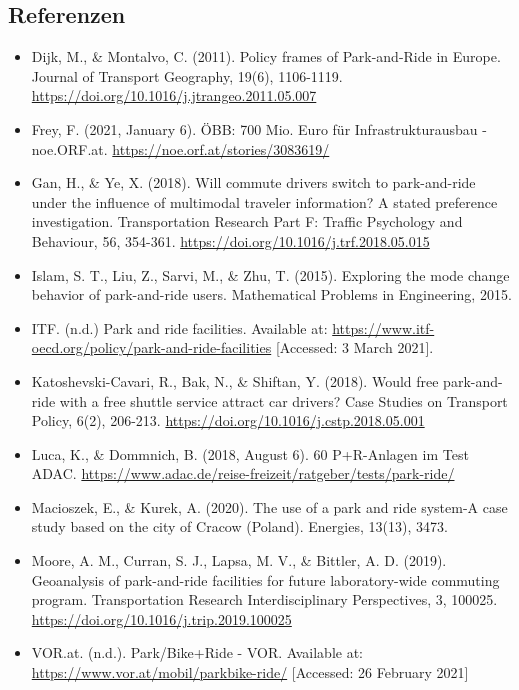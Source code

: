 \documentclass[
]{book}
\providecommand{\tightlist}{%
  \setlength{\itemsep}{0pt}\setlength{\parskip}{0pt}}
\begin{document}
\hypertarget{referenzen-25}{%
\subsection*{Referenzen}\label{referenzen-25}}

\begin{itemize}
\tightlist
\item
  Dijk, M., \& Montalvo, C. (2011). Policy frames of Park-and-Ride in Europe. Journal of Transport Geography, 19(6), 1106-1119. \url{https://doi.org/10.1016/j.jtrangeo.2011.05.007}
\item
  Frey, F. (2021, January 6). ÖBB: 700 Mio. Euro für Infrastrukturausbau - noe.ORF.at. \url{https://noe.orf.at/stories/3083619/}
\item
  Gan, H., \& Ye, X. (2018). Will commute drivers switch to park-and-ride under the influence of multimodal traveler information? A stated preference investigation. Transportation Research Part F: Traffic Psychology and Behaviour, 56, 354-361. \url{https://doi.org/10.1016/j.trf.2018.05.015}
\item
  Islam, S. T., Liu, Z., Sarvi, M., \& Zhu, T. (2015). Exploring the mode change behavior of park-and-ride users. Mathematical Problems in Engineering, 2015.
\item
  ITF. (n.d.) Park and ride facilities. Available at: \url{https://www.itf-oecd.org/policy/park-and-ride-facilities} {[}Accessed: 3 March 2021{]}.
\item
  Katoshevski-Cavari, R., Bak, N., \& Shiftan, Y. (2018). Would free park-and-ride with a free shuttle service attract car drivers? Case Studies on Transport Policy, 6(2), 206-213. \url{https://doi.org/10.1016/j.cstp.2018.05.001}
\item
  Luca, K., \& Dommnich, B. (2018, August 6). 60 P+R-Anlagen im Test \textbar{} ADAC. \url{https://www.adac.de/reise-freizeit/ratgeber/tests/park-ride/}
\item
  Macioszek, E., \& Kurek, A. (2020). The use of a park and ride system-A case study based on the city of Cracow (Poland). Energies, 13(13), 3473.
\item
  Moore, A. M., Curran, S. J., Lapsa, M. V., \& Bittler, A. D. (2019). Geoanalysis of park-and-ride facilities for future laboratory-wide commuting program. Transportation Research Interdisciplinary Perspectives, 3, 100025. \url{https://doi.org/10.1016/j.trip.2019.100025}
\item
  VOR.at. (n.d.). Park/Bike+Ride - VOR. Available at: \url{https://www.vor.at/mobil/parkbike-ride/} {[}Accessed: 26 February 2021{]}
\end{itemize}
\end{document}
